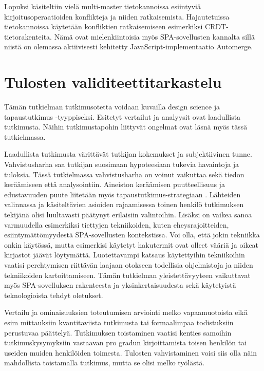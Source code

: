 \documentclass[finnish,twoside,censored,csm,sw-track-2018]{HYthesisML}
\begin{document}
Lopuksi käsiteltiin vielä multi-master tietokannoissa esiintyviä kirjoitusoperaatioiden konflikteja ja niiden ratkaisemista. Hajautetuissa tietokannoissa käytetään konfliktien ratkaisemiseen esimerkiksi CRDT-tietorakenteita. Nämä ovat mielenkiintoisia myös SPA-sovellusten kannalta sillä niistä on olemassa aktiivisesti kehitetty JavaScript-implementaatio Automerge.


\section{Tulosten validiteettitarkastelu}

Tämän tutkielman tutkimusotetta voidaan kuvailla design science ja tapaustutkimus -tyyppiseksi. Esitetyt vertailut ja analyysit ovat laadullista tutkimusta. Näihin tutkimustapohin liittyvät ongelmat ovat läsnä myös tässä tutkielmassa.

Laadullista tutkimusta värittävät tutkijan kokemukset ja subjektiivinen tunne. Vahvistusharha saa tutkijan suosimaan hypoteesiaan tukevia havaintoja ja tuloksia. Tässä tutkielmassa vahvistusharha on voinut vaikuttaa sekä tiedon keräämiseen että analysointiin. Aineiston keräämisen puutteellisuus ja edustavuuden puute liitetään myös  tapaustutkimus-strategiaan \citep{tutkimusmetodit}. Lähteiden valinnassa ja käsiteltävien asioiden rajaamisessa toinen henkilö tutkimuksen tekijänä olisi luultavasti päätynyt erilaisiin valintoihin. Lisäksi on vaikea sanoa varmuudella esimerkiksi tiettyjen tekniikoiden, kuten eheysrajoitteiden, esiintymättömyydestä SPA-sovellusten kontekstissa. Voi olla, että jokin tekniikka onkin käytössä, mutta esimerkisi käytetyt hakutermit ovat olleet vääriä ja oikeat kirjastot jäävät löytymättä. Luotettavampi katsaus käytettyihin tekniikoihin vaatisi perehtymisen riittävän laajaan otokseen todellisia ohjelmistoja ja niiden tekniikoiden kartoittamiseen. Tämän tutkielman yleistettävyyteen vaikuttavat myös SPA-sovelluksen rakenteesta ja yksinkertaisuudesta sekä käytetyistä teknologioista tehdyt oletukset.

Vertailu ja ominaisuuksien toteutumisen arviointi melko vapaamuotoista eikä esim mittauksiin kvantitaviista tutkimusta tai formaalimpaa todistuksiin perustuvaa päättelyä. Tutkimuksen toistaminen vaatisi kenties samoihin tutkimuskysymyksiin vastaavan pro gradun kirjoittamista toisen henkilön tai useiden muiden henkilöiden toimesta. Tulosten vahvistaminen voisi siis olla näin mahdollista toistamalla tutkimus, mutta se olisi melko työlästä.
\end{document}
